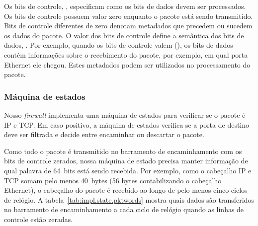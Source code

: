 Os bits de controle, , especificam como os bits de
dados devem ser processados.  Os bits de controle possuem valor zero
enquanto o pacote está sendo transmitido.  Bits de controle diferentes
de zero denotam metadados que precedem ou sucedem os dados do pacote.  O
valor dos bits de controle define a semântica dos bits de dados,
.  Por exemplo, quando os bits de controle valem
 (), os bits de dados contém
informações sobre o recebimento do pacote, por exemplo, em qual porta
Ethernet ele chegou.  Estes metadados podem ser utilizados no
processamento do pacote.


\subsubsection{Máquina de estados}

Nosso \emph{firewall} implementa uma máquina de estados para verificar
se o pacote é IP e TCP.  Em caso positivo, a máquina de estados verifica
se a porta de destino deve ser filtrada e decide entre encaminhar ou
descartar o pacote.

Como todo o pacote é transmitido no barramento de encaminhamento com os
bits de controle zerados, nossa máquina de estado precisa manter
informação de qual palavra de 64~bits está sendo recebida.  Por exemplo,
como o cabeçalho IP e TCP somam pelo menos 40~bytes (56 bytes
contabilizando o cabeçalho Ethernet), o cabeçalho do pacote é recebido
ao longo de pelo menos cinco ciclos de relógio.  A
tabela~\ref{tab:impl.state.pktwords} mostra quais dados são transferidos
no barramento de encaminhamento a cada ciclo de relógio quando as linhas
de controle estão zeradas.

